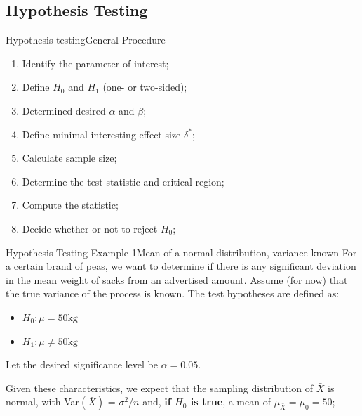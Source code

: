 \subsection{Hypothesis Testing}
\begin{frame}{Hypothesis testing}{General Procedure}
  \begin{enumerate}
    \item Identify the parameter of interest;
    \item Define $H_0$ and $H_1$ (one- or two-sided);
    \item Determined desired $\alpha$ and $\beta$;
    \item Define minimal interesting effect size $\delta^{*}$;
    \item Calculate sample size;
    \item Determine the test statistic and critical region;
    \item Compute the statistic;
    \item Decide whether or not to reject $H_0$;
  \end{enumerate}
\end{frame}

\begin{frame}{Hypothesis Testing Example 1}{Mean of a normal distribution, variance known}
  For a certain brand of peas, we want to determine if there is any significant deviation in the mean weight of sacks from an advertised amount. Assume (for now) that the true variance of the process is known. The test hypotheses are defined as:\medskip

  \begin{itemize}
    \item $H_0: \mu = 50\text{kg}$
    \item $H_1: \mu \neq 50\text{kg}$
  \end{itemize}\medskip

  Let the desired significance level be $\alpha = 0.05$.\medskip

  Given these characteristics, we expect that the sampling distribution of $\bar{X}$ is normal, with Var$(\bar{X})$ = $\sigma^2/n$ and, {\bf if $H_0$ is true}, a mean of $\mu_{\bar{X}} = \mu_0 = 50$;
\end{frame}

